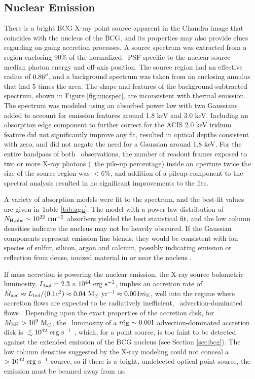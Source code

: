 \documentclass[iop]{emulateapj}
\begin{document}
\subsection{Nuclear Emission}
\label{sec:nuc}

There is a bright BCG X-ray point source apparent in the Chandra image
that coincides with the nucleus of the BCG, and its properties may
also provide clues regarding on-going accretion processes. A source
spectrum was extracted from a region enclosing 90\% of the normalized
\cxo\ PSF specific to the nuclear source median photon energy and
off-axis position. The source region had an effective radius of
$0.86\rm{^\prime}\hskip -0.1em\rm{^\prime}$, and a background spectrum was taken from an enclosing
annulus that had 5 times the area. The shape and features of the
background-subtracted spectrum, shown in Figure \ref{fig:nucspec}, are
inconsistent with thermal emission. The spectrum was modeled using an
absorbed power law with two Gaussians added to account for emission
features around 1.8 keV and 3.0 keV. Including an absorption edge
component to further correct for the ACIS 2.0 keV iridium feature did
not significantly improve any fit, resulted in optical depths
consistent with zero, and did not negate the need for a Gaussian
around 1.8 keV. For the entire bandpass of both \cxo\ observations,
the number of readout frames exposed to two or more X-ray photons
(\ie\ the pile-up percentage) inside an aperture twice the size of the
source region was $< 6\%$, and addition of a pileup component to the
spectral analysis resulted in no significant improvements to the fits.

A variety of absorption models were fit to the spectrum, and the
best-fit values are given in Table \ref{tab:agn}. The model with a
power-law distribution of $N_{\rm{H,obs}} \sim 10^{22} ~\mbox{\ensuremath{\rm{cm^{-2}}}}$ absorbers
yielded the best statistical fit, and the low column densities
indicate the nucleus may not be heavily obscured. If the Gaussian
components represent emission line blends, they would be consistent
with ion species of sulfur, silicon, argon and calcium, possibly
indicating emission or reflection from dense, ionized material in or
near the nucleus \citep[\eg][]{1990ApJ...362...90B,
  1998MNRAS.297.1219I}.

If mass accretion is powering the nuclear emission, the X-ray source
bolometric luminosity, $L_{\rm{bol}} = 2.3 \times 10^{44} ~\rm{\mbox{\ensuremath{\rm{erg}}}~\ensuremath{\rm{\mbox{\ensuremath{\rm{s}}}^{-1}}}}$, implies an
accretion rate of $\dot{M}_{\rm{acc}} \approx L_{\rm{bol}}/(0.1 c^2) \approx 0.04
~\mbox{\ensuremath{\rm{M_{\odot}}~\rm{\mbox{\ensuremath{\rm{yr}}}^{-1}}}} \approx 0.001 \dot{m_{\rm{E}}}$, well into the regime where accretion
flows are expected to be radiatively inefficient,
\eg\ advection-dominated flows \citep{adaf}. Depending upon the exact
properties of the accretion disk, for $M_{\rm{BH}} > 10^9 ~\rm{M_{\odot}}$, the
\hbeta\ luminosity of a $\dot{m_{\rm{E}}} \sim 0.001$ advection-dominated
accretion disk is $\la 10^{42} ~\lum$ \citep{2002ApJ...570L..13C},
which, for a point source, is too faint to be detected against the
extended emission of the BCG nucleus (see Section \ref{sec:bcg}). The
low column densities suggested by the X-ray modeling could not conceal
a $> 10^{42} ~\rm{\mbox{\ensuremath{\rm{erg}}}~\ensuremath{\rm{\mbox{\ensuremath{\rm{s}}}^{-1}}}}$ source, so if there is a bright, undetected
optical point source, the emission must be beamed away from us.
\end{document}
